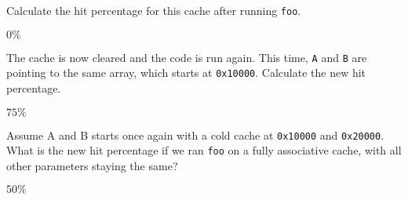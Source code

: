 \begin{blocksection}
\question
Calculate the hit percentage for this cache after running \lstinline$foo$.
\begin{solution}[0.5in]
$0\%$
\end{solution}


\question
The cache is now cleared and the code is run again. This time, \lstinline$A$ and \lstinline$B$ are pointing to the same array, which starts at \lstinline$0x10000$. Calculate the new hit percentage.
\begin{solution}[0.5in]
$75\%$
\end{solution}


\question
Assume A and B starts once again with a cold cache at \lstinline$0x10000$ and \lstinline$0x20000$. What is the new hit percentage if we ran \lstinline$foo$ on a fully associative cache, with all other parameters staying the same?
\begin{solution}[0.5in]
$50\%$
\end{solution}

\end{blocksection}